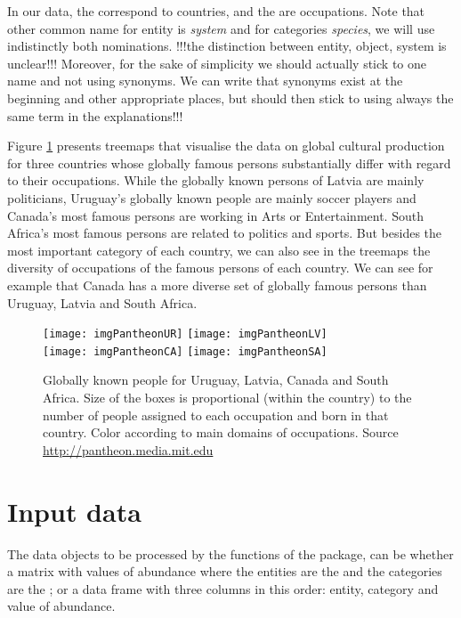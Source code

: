 In our data, the  correspond to countries, and the  are occupations. Note that other common name for entity is \emph{system} and for categories \emph{species}, we will use indistinctly both nominations.  
!!!the distinction between entity, object, system is unclear!!! Moreover, for the sake of simplicity we should actually stick to one name and not using synonyms. We can write that synonyms exist at the beginning and other appropriate places, but should then stick to using always the same term in the explanations!!!

Figure \ref{figure:pantheon} presents treemaps that visualise the data on global cultural production for three countries whose globally famous persons substantially differ with regard to their occupations. While the globally known persons of Latvia are mainly politicians, Uruguay's globally known people are mainly soccer players and Canada's most famous persons are working in Arts or Entertainment. South Africa's most famous persons are related to politics and sports. But besides the most important category of each country, we can also see in the treemaps the diversity of occupations of the famous persons of each country. We can see for example that Canada has a more diverse set of globally famous persons than Uruguay, Latvia and South Africa.

\begin{figure}[htbp]
  \centering
 \texttt{[image: imgPantheonUR]} 
 \texttt{[image: imgPantheonLV]} \\
   \texttt{[image: imgPantheonCA]} 
      \texttt{[image: imgPantheonSA]} 
  \caption{Globally known people for Uruguay, Latvia, Canada and South Africa. Size of the boxes is proportional (within the country) to the number of people assigned to each occupation and born in that country. Color according to main domains of occupations. Source \url{http://pantheon.media.mit.edu}}
  \label{figure:pantheon}
\end{figure}



\section{Input data}
The data objects to be processed by the functions of the  package, can be whether a matrix with values of abundance where the entities are the  and the categories are the ; or a data frame with three columns in this order: entity, category and value of abundance.

